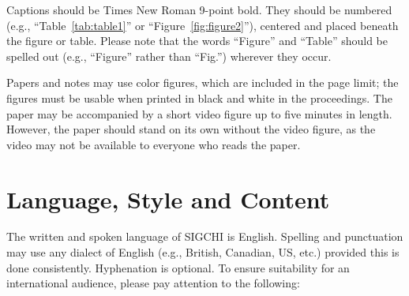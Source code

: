 \documentclass{article}
\begin{document}
Captions should be Times New Roman 9-point bold.  They should be numbered (e.g.,
``Table~\ref{tab:table1}'' or ``Figure~\ref{fig:figure2}''), centered
and placed beneath the figure or table.  Please note that the words
``Figure'' and ``Table'' should be spelled out (e.g., ``Figure''
rather than ``Fig.'') wherever they occur.

Papers and notes may use color figures, which are included in the page
limit; the figures must be usable when printed in black and white in
the proceedings.  The paper may be accompanied by a short video figure
up to five minutes in length.  However, the paper should stand on its
own without the video figure, as the video may not be available to
everyone who reads the paper.

\section{Language, Style and Content}

The written and spoken language of SIGCHI is English. Spelling and
punctuation may use any dialect of English (e.g., British, Canadian,
US, etc.) provided this is done consistently. Hyphenation is
optional. To ensure suitability for an international audience, please
pay attention to the following:
\end{document}
